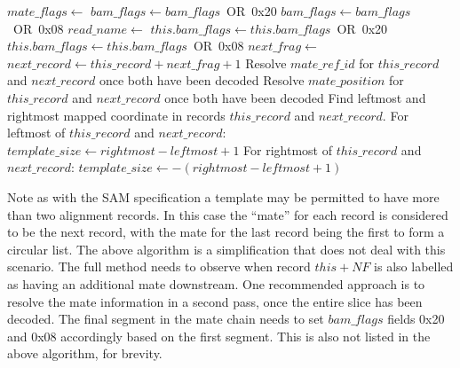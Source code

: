 \documentclass[a4paper]{article}
\begin{document}
\begin{algorithmic}[1]
  \State $mate\_flags\gets $ 
    \State $bam\_flags\gets bam\_flags$\ OR\ 0x20
  \EndIf
    \State $bam\_flags\gets bam\_flags$\ OR\ 0x08
  \EndIf
    \State $read\_name \gets$ 
  \EndIf
\settowidth{\maxwidth}{mate\_position\ }
\State {}  
\State {} 
\State {} 
    \State $this.bam\_flags \gets this.bam\_flags$\ OR\ 0x20
  \EndIf
    \State $this.bam\_flags \gets this.bam\_flags$\ OR\ 0x08
  \EndIf
  \State $next\_frag\gets$ 
  \State $next\_record\gets this\_record + next\_frag + 1$
  \State Resolve $mate\_ref\_id$ for $this\_record$ and $next\_record$ once both have been decoded
  \State Resolve $mate\_position$ for $this\_record$ and $next\_record$ once both have been decoded
  \State Find leftmost and rightmost mapped coordinate in records $this\_record$ and $next\_record$.
  \State For leftmost of $this\_record$ and $next\_record$: $template\_size\gets rightmost-leftmost+1$
  \State For rightmost of $this\_record$ and $next\_record$: $template\_size\gets -(rightmost-leftmost+1)$
\EndIf
\EndProcedure
\end{algorithmic}

Note as with the SAM specification a template may be permitted to have more than two alignment records.
In this case the ``mate'' for each record is considered to be the next record, with the mate for the last record being the first to form a circular list.
The above algorithm is a simplification that does not deal with this scenario.
The full method needs to observe when record $this+NF$ is also labelled as having an additional mate downstream.
One recommended approach is to resolve the mate information in a second pass, once the entire slice has been decoded.
The final segment in the mate chain needs to set $bam\_flags$ fields 0x20 and 0x08 accordingly based on the first segment.
This is also not listed in the above algorithm, for brevity.
\end{document}
